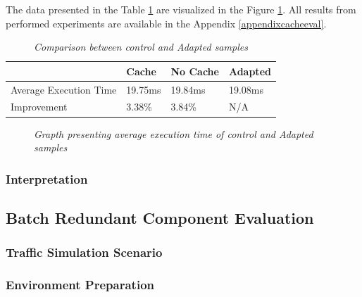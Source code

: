 \documentclass[10pt,a4paper]{article}
\begin{document}
The data presented in the Table \ref{cacheCompResutls} are visualized in the Figure \ref{cacheEvalResutlsGraph}.  All results from performed experiments are available in the Appendix \ref{appendixcacheeval}. 

\begin{table}[!htb]
\caption{\textit{Comparison between control and Adapted samples}} \label{cacheCompResutls}
\begin{tabularx}{\textwidth}{p{4cm}|X|X|X}
 & \textbf{Cache} & \textbf{No Cache} & \textbf{Adapted} \\ \hline
Average Execution Time &  19.75ms & 19.84ms & 19.08ms\\ \hline
Improvement &  3.38\% & 3.84\% & N/A\\ 
\end{tabularx}
\end{table}

\begin{figure}[!htb]
\centering
{}
\caption{\textit{Grapth presenting average execution time of control and Adapted samples}} \label{cacheEvalResutlsGraph}
\end{figure}


\subsubsection{Interpretation} 


 

\subsection{Batch Redundant Component Evaluation}
\subsubsection{Traffic Simulation Scenario} 
\subsubsection{Environment Preparation} 
\end{document}
